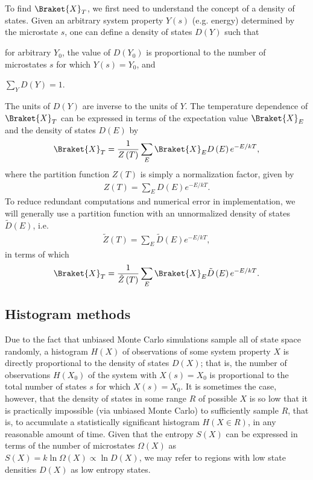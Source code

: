 \documentclass[11pt]{article}
\newcommand{\bk}{\Braket} %
\newcommand{\f}[2]{\dfrac{#1}{#2}} %
\newcommand{\p}[1]{\left(#1\right)} %
\begin{document}
To find $\bk{X}_T$, we first need to understand the concept of a
density of states. Given an arbitrary system property $Y\p{s}$
(e.g. energy) determined by the microstate $s$, one can define a
density of states $D\p{Y}$ such that
\begin{enumerate*}[label=\roman*)]
\item for arbitrary $Y_0$, the value of $D\p{Y_0}$ is proportional to
  the number of microstates $s$ for which $Y\p{s}=Y_0$, and
\item $\sum_YD\p{Y}=1$.
\end{enumerate*}
The units of $D\p{Y}$ are inverse to the units of $Y$. The temperature
dependence of $\bk{X}_T$ can be expressed in terms of the expectation
value $\bk{X}_E$ and the density of states $D\p{E}$ by
\begin{align}
  \bk{X}_T=\f1{Z\p{T}}\sum_E\bk{X}_ED\p{E}e^{-E/kT},
  \label{eq:XT_norm}
\end{align}
where the partition function $Z\p{T}$ is simply a normalization
factor, given by
\begin{align}
  Z\p{T}=\sum_ED\p{E}e^{-E/kT}.
  \label{eq:Z_norm}
\end{align}
To reduce redundant computations and numerical error in
implementation, we will generally use a partition function with an
unnormalized density of states $\tilde D\p{E}$, i.e.
\begin{align}
  \tilde Z\p{T}=\sum_E\tilde D\p{E}e^{-E/kT},
  \label{eq:Z}
\end{align}
in terms of which
\begin{align}
  \bk{X}_T=\f1{\tilde Z\p{T}}\sum_E\bk{X}_E\tilde D\p{E}e^{-E/kT}.
  \label{eq:XT}
\end{align}

\subsection{Histogram methods}
\label{sec:histogram_methods}

Due to the fact that unbiased Monte Carlo simulations sample all of
state space randomly, a histogram $H\p{X}$ of observations of some
system property $X$ is directly proportional to the density of states
$D\p{X}$; that is, the number of observations $H\p{X_0}$ of the system
with $X\p{s}=X_0$ is proportional to the total number of states $s$
for which $X\p{s}=X_0$. It is sometimes the case, however, that the
density of states in some range $R$ of possible $X$ is so low that it
is practically impossible (via unbiased Monte Carlo) to sufficiently
sample $R$, that is, to accumulate a statistically significant
histogram $H\p{X\in R}$, in any reasonable amount of time. Given that
the entropy $S\p{X}$ can be expressed in terms of the number of
microstates $\Omega\p{X}$ as $S\p{X}=k\ln\Omega\p{X}\propto\ln
D\p{X}$, we may refer to regions with low state densities $D\p{X}$ as
low entropy states.
\end{document}
